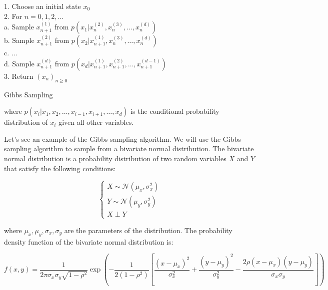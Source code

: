 \documentclass{article}
\begin{document}
\begin{center}
	\begin{minipage}{0.7\linewidth} %
		\begin{algorithm}[H]
			1. Choose an initial state $x_0$ \\
			2. For $n = 0, 1, 2, \dots$ \\
			\hspace*{0.5cm} a. Sample $x_{n+1}^{(1)}$ from $p(x_1 | x_n^{(2)}, x_n^{(3)}, \dots, x_n^{(d)})$ \\
			\hspace*{0.5cm} b. Sample $x_{n+1}^{(2)}$ from $p(x_2 | x_{n+1}^{(1)}, x_n^{(3)}, \dots, x_n^{(d)})$ \\
			\hspace*{0.5cm} c. $\dots$ \\
			\hspace*{0.5cm} d. Sample $x_{n+1}^{(d)}$ from $p(x_d | x_{n+1}^{(1)}, x_{n+1}^{(2)}, \dots, x_{n+1}^{(d-1)})$ \\
			3. Return $(x_n)_{n \geq 0}$
			\caption{Gibbs Sampling} %
			\label{alg:Gibbs-Sampling}   %
		\end{algorithm}
	\end{minipage}
\end{center}

where $p(x_i | x_1, x_2, \dots, x_{i-1}, x_{i+1}, \dots, x_d)$ is the conditional probability distribution of $x_i$ given all other variables. 


Let's see an example of the Gibbs sampling algorithm. We will use the Gibbs sampling algorithm to sample from a bivariate normal distribution. The bivariate normal distribution is a probability distribution of two random variables $X$ and $Y$ that satisfy the following conditions:

\[
	\begin{cases}
		X \sim \mathcal{N}(\mu_x, \sigma_x^2) \\
		Y \sim \mathcal{N}(\mu_y, \sigma_y^2) \\
		X \perp Y
	\end{cases}
\]

where $\mu_x, \mu_y, \sigma_x, \sigma_y$ are the parameters of the distribution. The probability density function of the bivariate normal distribution is:

\[
	f(x,y) = \frac{1}{2 \pi \sigma_x \sigma_y \sqrt{1 - \rho^2}} \exp \left( -\frac{1}{2(1 - \rho^2)} \left[ \frac{(x - \mu_x)^2}{\sigma_x^2} + \frac{(y - \mu_y)^2}{\sigma_y^2} - \frac{2 \rho (x - \mu_x)(y - \mu_y)}{\sigma_x \sigma_y} \right] \right)
\]
\end{document}
